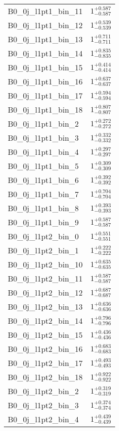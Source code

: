 \begin{tabular}{|l|c|}
B0\_0j\_l1pt1\_bin\_11 & $1^{+0.587}_{-0.587}$ \\
B0\_0j\_l1pt1\_bin\_12 & $1^{+0.539}_{-0.539}$ \\
B0\_0j\_l1pt1\_bin\_13 & $1^{+0.711}_{-0.711}$ \\
B0\_0j\_l1pt1\_bin\_14 & $1^{+0.835}_{-0.835}$ \\
B0\_0j\_l1pt1\_bin\_15 & $1^{+0.414}_{-0.414}$ \\
B0\_0j\_l1pt1\_bin\_16 & $1^{+0.637}_{-0.637}$ \\
B0\_0j\_l1pt1\_bin\_17 & $1^{+0.594}_{-0.594}$ \\
B0\_0j\_l1pt1\_bin\_18 & $1^{+0.807}_{-0.807}$ \\
B0\_0j\_l1pt1\_bin\_2 & $1^{+0.272}_{-0.272}$ \\
B0\_0j\_l1pt1\_bin\_3 & $1^{+0.332}_{-0.332}$ \\
B0\_0j\_l1pt1\_bin\_4 & $1^{+0.297}_{-0.297}$ \\
B0\_0j\_l1pt1\_bin\_5 & $1^{+0.309}_{-0.309}$ \\
B0\_0j\_l1pt1\_bin\_6 & $1^{+0.392}_{-0.392}$ \\
B0\_0j\_l1pt1\_bin\_7 & $1^{+0.704}_{-0.704}$ \\
B0\_0j\_l1pt1\_bin\_8 & $1^{+0.393}_{-0.393}$ \\
B0\_0j\_l1pt1\_bin\_9 & $1^{+0.587}_{-0.587}$ \\
B0\_0j\_l1pt2\_bin\_0 & $1^{+0.551}_{-0.551}$ \\
B0\_0j\_l1pt2\_bin\_1 & $1^{+0.222}_{-0.222}$ \\
B0\_0j\_l1pt2\_bin\_10 & $1^{+0.635}_{-0.635}$ \\
B0\_0j\_l1pt2\_bin\_11 & $1^{+0.587}_{-0.587}$ \\
B0\_0j\_l1pt2\_bin\_12 & $1^{+0.687}_{-0.687}$ \\
B0\_0j\_l1pt2\_bin\_13 & $1^{+0.636}_{-0.636}$ \\
B0\_0j\_l1pt2\_bin\_14 & $1^{+0.796}_{-0.796}$ \\
B0\_0j\_l1pt2\_bin\_15 & $1^{+0.436}_{-0.436}$ \\
B0\_0j\_l1pt2\_bin\_16 & $1^{+0.683}_{-0.683}$ \\
B0\_0j\_l1pt2\_bin\_17 & $1^{+0.493}_{-0.493}$ \\
B0\_0j\_l1pt2\_bin\_18 & $1^{+0.922}_{-0.922}$ \\
B0\_0j\_l1pt2\_bin\_2 & $1^{+0.319}_{-0.319}$ \\
B0\_0j\_l1pt2\_bin\_3 & $1^{+0.374}_{-0.374}$ \\
B0\_0j\_l1pt2\_bin\_4 & $1^{+0.439}_{-0.439}$ \\

\end{tabular}
